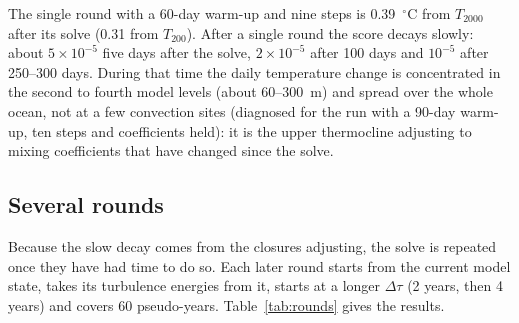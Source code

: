 \documentclass{article}
\begin{document}
The single round with a 60-day warm-up and nine steps is 0.39~$^\circ$C from $T_{2000}$ after its solve (0.31 from $T_{200}$). After a single round the score decays slowly: about $5\times10^{-5}$ five days after the solve, $2\times10^{-5}$ after 100 days and $10^{-5}$ after 250--300 days. During that time the daily temperature change is concentrated in the second to fourth model levels (about 60--300~m) and spread over the whole ocean, not at a few convection sites (diagnosed for the run with a 90-day warm-up, ten steps and coefficients held): it is the upper thermocline adjusting to mixing coefficients that have changed since the solve.

\subsection{Several rounds}\label{sec:rounds}

Because the slow decay comes from the closures adjusting, the solve is repeated once they have had time to do so. Each later round starts from the current model state, takes its turbulence energies from it, starts at a longer $\Delta\tau$ (2 years, then 4 years) and covers 60 pseudo-years. Table~\ref{tab:rounds} gives the results.
\end{document}
